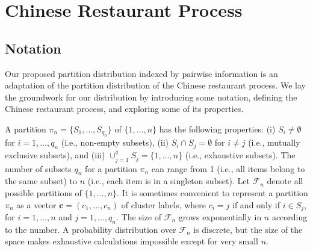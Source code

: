 \documentclass[lineno]{biometrika-dbd}
\newcommand{\partition}{\ensuremath{\pi}}
\newcommand{\redact}[1]{}
\begin{document}
\redact{
The paper is organized as follows.  The probability distribution on
partitions that is induced by the Dirichlet process is described in Section
\ref{sec_dp}.  In Section \ref{sec_attraction} we show how to modify the usual
Dirichlet process algorithms to yield the Attraction distribution for a
distance-based probability distribution on partitions.  The Affinity
distribution --- an alternative distance-based probability distribution
on partitions --- is described in Section \ref{sec_affinity}.  In Section
\ref{sec_properties}, we explore the properties of the proposed distributions
and show that a new class of Bayesian nonparametric models is available when
using these distributions as a prior clustering distribution.  The method is
illustrated in Section \ref{sec_mobility} in an example of protein structure
prediction and is shown to be substantially better than the leading alternative.
We conclude in Section \ref{sec_conclusion} by discussing computational
efficiency, other applications, and extensions of the proposed methodology.
}

\section{Chinese Restaurant Process}
\label{sec_cr}

\subsection{Notation}
\label{sec_notation}

Our proposed partition distribution indexed by pairwise information is an
adaptation of the partition distribution of the Chinese restaurant process.  We
lay the groundwork for our distribution by introducing some notation, defining
the Chinese restaurant process, and exploring some of its properties.

A partition $\partition_n = \{S_1,\ldots,S_{q_n}\}$ of $\{1,\ldots,n\}$ has the
following properties: (i) $S_i \not= \emptyset$ for $i=1,\ldots,q_n$ (i.e.,
non-empty subsets), (ii) $S_i \cap S_j = \emptyset$ for $i \not= j$ (i.e.,
mutually exclusive subsets), and (iii) $\cup_{j=1}^q S_j = \{1,\ldots,n\}$
(i.e., exhaustive subsets).  The number of subsets $q_n$ for a partition
$\partition_n$ can range from 1 (i.e., all items belong to the same subset) to
$n$ (i.e., each item is in a singleton subset).  Let $\mathcal{F}_n$ denote all
possible partitions of $\{1,\ldots,n\}$.  It is sometimes convenient to
represent a partition $\partition_n$ as a vector $\bm{c} = (c_1,\ldots,c_n)$ of
cluster labels, where $c_i = j$ if and only if $i \in S_j$, for $i=1,\ldots,n$
and $j=1,\ldots,q_n$.  The size of $\mathcal{F}_n$ grows exponentially in $n$
according to the \citet{bell:1934} number.  A probability distribution over
$\mathcal{F}_n$ is discrete, but the size of the space makes exhaustive
calculations impossible except for very small $n$.
\end{document}
